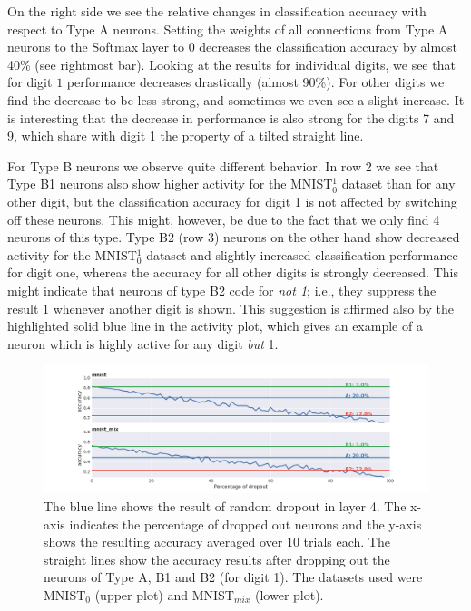 \documentclass[10pt,a4paper]{article}
\begin{document}
\noindent On the right side we see the relative changes in classification accuracy with respect to Type A neurons. Setting the weights of all connections from Type A neurons to the Softmax layer to 0 decreases the classification accuracy by almost 40\% (see rightmost bar). Looking at the results for individual digits, we see that for digit $1$ performance decreases drastically (almost 90\%). For other digits we find the decrease to be less strong, and sometimes we even see a slight increase. It is interesting that the decrease in performance is also strong for the digits 7 and 9, which share with digit 1 the property of a tilted straight line. \newline

\noindent For Type B neurons we observe quite different behavior. In row 2 we see that Type B1 neurons also show higher activity for the MNIST$_{0}^{1}$ dataset than for any other digit, but the classification accuracy for digit 1 is not affected by switching off these neurons. This might, however, be due to the fact that we only find 4 neurons of this type.\newline
\noindent  Type B2 (row 3) neurons on the other hand show decreased activity for the MNIST$_{0}^{1}$ dataset and slightly increased classification performance for digit one, whereas the accuracy for all other digits is strongly decreased. This might indicate that neurons of type B2 code for \textit{not 1}; i.e., they suppress the result $1$ whenever another digit is shown. This suggestion is affirmed also by the highlighted solid blue line in the activity plot, which gives an example of a neuron which is highly active for any digit \textit{but} 1.


\begin{figure}[h]
\begin{center}
\includegraphics[scale = .4]{rand_vs_specific_dropout_lay4.png}
\caption{\footnotesize{The blue line shows the result of random dropout in layer 4. The x-axis indicates the percentage of dropped out neurons and the y-axis shows the resulting accuracy averaged over 10 trials each. The straight lines show the accuracy results after dropping out the neurons of Type A, B1 and B2 (for digit 1). The datasets used were MNIST$_0$ (upper plot) and MNIST$_{mix}$ (lower plot). }}
\label{droput}
\end{center}
\end{figure}
\end{document}
